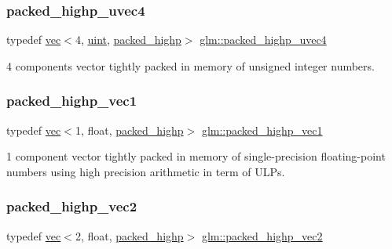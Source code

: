 \subsubsection{\texorpdfstring{packed\+\_\+highp\+\_\+uvec4}{packed\_highp\_uvec4}}
{\footnotesize\ttfamily typedef \hyperlink{structglm_1_1vec}{vec}$<$4, \hyperlink{group__core__precision_ga4fd29415871152bfb5abd588334147c8}{uint}, \hyperlink{namespaceglm_a36ed105b07c7746804d7fdc7cc90ff25a8e8791ee77fe079b1291f710d88031bf}{packed\+\_\+highp}$>$ \hyperlink{group__gtc__type__aligned_ga769bab317264c023f8ee77897e4b5894}{glm\+::packed\+\_\+highp\+\_\+uvec4}}



4 components vector tightly packed in memory of unsigned integer numbers. 

\mbox{\label{group__gtc__type__aligned_ga0356e10a8b10f699cf7cf4308f449c83}} 
\subsubsection{\texorpdfstring{packed\+\_\+highp\+\_\+vec1}{packed\_highp\_vec1}}
{\footnotesize\ttfamily typedef \hyperlink{structglm_1_1vec}{vec}$<$1, float, \hyperlink{namespaceglm_a36ed105b07c7746804d7fdc7cc90ff25a8e8791ee77fe079b1291f710d88031bf}{packed\+\_\+highp}$>$ \hyperlink{group__gtc__type__aligned_ga0356e10a8b10f699cf7cf4308f449c83}{glm\+::packed\+\_\+highp\+\_\+vec1}}



1 component vector tightly packed in memory of single-\/precision floating-\/point numbers using high precision arithmetic in term of U\+L\+Ps. 

\mbox{\label{group__gtc__type__aligned_ga15068ebf3dae2c205d90b1d36780bf9b}} 
\subsubsection{\texorpdfstring{packed\+\_\+highp\+\_\+vec2}{packed\_highp\_vec2}}
{\footnotesize\ttfamily typedef \hyperlink{structglm_1_1vec}{vec}$<$2, float, \hyperlink{namespaceglm_a36ed105b07c7746804d7fdc7cc90ff25a8e8791ee77fe079b1291f710d88031bf}{packed\+\_\+highp}$>$ \hyperlink{group__gtc__type__aligned_ga15068ebf3dae2c205d90b1d36780bf9b}{glm\+::packed\+\_\+highp\+\_\+vec2}}



